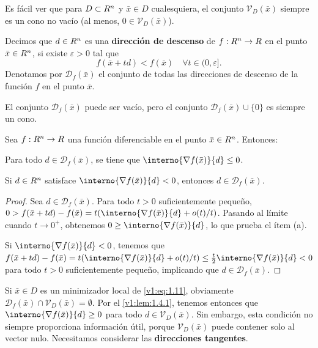 Es fácil ver que para $D \subset R^n$ y $\bar{x} \in D$ cualesquiera, el conjunto $\mathcal{V}_D(\bar{x})$ siempre es un cono no vacío (al menos, $0 \in \mathcal{V}_D(\bar{x})$).

\begin{definition}\label{v1:def:1.4.3}
 Decimos que $d \in R^n$ es una \textbf{dirección de descenso} de $f : R^n \to R$ en el punto $\bar{x} \in R^n$, si existe $\varepsilon > 0$ tal que
 \[
 f(\bar{x} + td) < f(\bar{x}) \quad \forall t \in (0, \varepsilon].
 \]
 Denotamos por $\mathcal{D}_f(\bar{x})$ el conjunto de todas las direcciones de descenso de la función $f$ en el punto $\bar{x}$.
\end{definition}

El conjunto $\mathcal{D}_f(\bar{x})$ puede ser vacío, pero el conjunto $\mathcal{D}_f(\bar{x}) \cup \{0\}$ es siempre un cono.

\begin{lemma}\label{v1:lem:1.4.1}
 Sea $f : R^n \to R$ una función diferenciable en el punto $\bar{x} \in R^n$. Entonces:
 \begin{enuthm}
 \item Para todo $d \in \mathcal{D}_f(\bar{x})$, se tiene que $\interno{\nabla f(\bar{x})}{d} \le 0$.
 \item Si $d \in R^n$ satisface $\interno{\nabla f(\bar{x})}{d} < 0$, entonces $d \in \mathcal{D}_f(\bar{x})$.
 \end{enuthm}
\end{lemma}

\begin{proof}
 Sea $d \in \mathcal{D}_f(\bar{x})$. Para todo $t > 0$ suficientemente pequeño, $0 > f(\bar{x} + td) - f(\bar{x}) = t(\interno{\nabla f(\bar{x})}{d} + o(t)/t)$. Pasando al límite cuando $t \to 0^+$, obtenemos $0 \ge \interno{\nabla f(\bar{x})}{d}$, lo que prueba el ítem (a).
 
 Si $\interno{\nabla f(\bar{x})}{d} < 0$, tenemos que $f(\bar{x} + td) - f(\bar{x}) = t(\interno{\nabla f(\bar{x})}{d} + o(t)/t) \le \frac{t}{2}\interno{\nabla f(\bar{x})}{d} < 0$ para todo $t > 0$ suficientemente pequeño, implicando que $d \in \mathcal{D}_f(\bar{x})$.
\end{proof}

Si $\bar{x} \in D$ es un minimizador local de \eqref{v1:eq:1.11}, obviamente $\mathcal{D}_f(\bar{x}) \cap \mathcal{V}_D(\bar{x}) = \emptyset$. Por el \cref{v1:lem:1.4.1}, tenemos entonces que $\interno{\nabla f(\bar{x})}{d} \ge 0$ para todo $d \in \mathcal{V}_D(\bar{x})$. Sin embargo, esta condición no siempre proporciona información útil, porque $\mathcal{V}_D(\bar{x})$ puede contener solo al vector nulo. Necesitamos considerar las \textbf{direcciones tangentes}.

